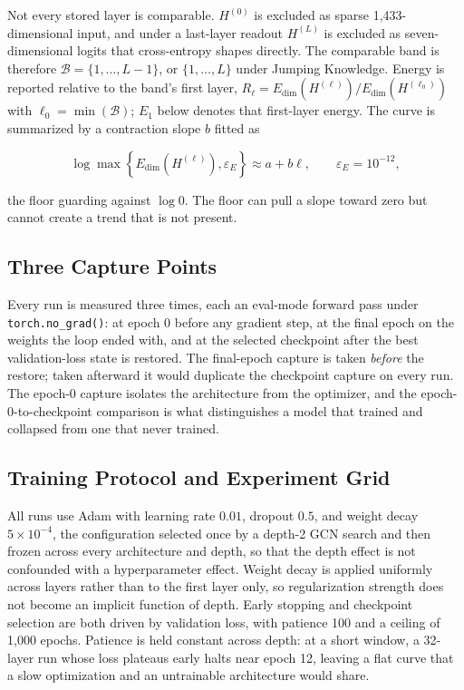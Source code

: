 \documentclass[
  conference]{IEEEtran}
\begin{document}
Not every stored layer is comparable. \(H^{(0)}\) is excluded as sparse
1,433-dimensional input, and under a last-layer readout \(H^{(L)}\) is
excluded as seven-dimensional logits that cross-entropy shapes directly.
The comparable band is therefore \(\mathcal{B}=\{1,\ldots,L-1\}\), or
\(\{1,\ldots,L\}\) under Jumping Knowledge. Energy is reported relative
to the band's first layer,
\(R_\ell=E_{\mathrm{dim}}(H^{(\ell)})/E_{\mathrm{dim}}(H^{(\ell_0)})\)
with \(\ell_0=\min(\mathcal{B})\); \(E_1\) below denotes that
first-layer energy. The curve is summarized by a contraction slope \(b\)
fitted as

\[
\log\max\!\left\{E_{\mathrm{dim}}\!\left(H^{(\ell)}\right),\varepsilon_E\right\}\approx a+b\ell,
\qquad \varepsilon_E=10^{-12},
\]

the floor guarding against \(\log 0\). The floor can pull a slope toward
zero but cannot create a trend that is not present.

\subsection{Three Capture Points}\label{three-capture-points}

Every run is measured three times, each an eval-mode forward pass under
\texttt{torch.no\_grad()}: at epoch 0 before any gradient step, at the
final epoch on the weights the loop ended with, and at the selected
checkpoint after the best validation-loss state is restored. The
final-epoch capture is taken \emph{before} the restore; taken afterward
it would duplicate the checkpoint capture on every run. The epoch-0
capture isolates the architecture from the optimizer, and the
epoch-0-to-checkpoint comparison is what distinguishes a model that
trained and collapsed from one that never trained.

\subsection{Training Protocol and Experiment
Grid}\label{training-protocol-and-experiment-grid}

All runs use Adam \citep{kingma2015adam} with learning rate \(0.01\),
dropout \(0.5\), and weight decay \(5\times10^{-4}\), the configuration
selected once by a depth-2 GCN search and then frozen across every
architecture and depth, so that the depth effect is not confounded with
a hyperparameter effect. Weight decay is applied uniformly across layers
rather than to the first layer only, so regularization strength does not
become an implicit function of depth. Early stopping and checkpoint
selection are both driven by validation loss, with patience 100 and a
ceiling of 1,000 epochs. Patience is held constant across depth: at a
short window, a 32-layer run whose loss plateaus early halts near epoch
12, leaving a flat curve that a slow optimization and an untrainable
architecture would share.
\end{document}
